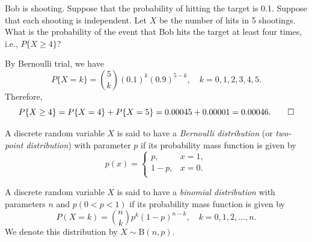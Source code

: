 \begin{example}
  Bob is shooting. Suppose that the probability of hitting the target is 0.1. Suppose that each shooting is independent. Let \(X\) be the number of hits in 5 shootings. What is the probability of the event that Bob hits the target at least four times, i.e., \(P\{X \geq 4\}\)?
\end{example}
\begin{solution}
  By Bernoulli trial, we have
  \[
    P\{X = k\} = \binom{5}{k} (0.1)^k (0.9)^{5-k}, \quad k = 0, 1, 2, 3, 4, 5.
  \]
  Therefore,
  \[
    P\{X \geq 4\} = P\{X = 4\} + P\{X = 5\} = 0.00045 + 0.00001 = 0.00046. \qedhere
  \]
\end{solution}

\begin{definition}
  A discrete random variable \(X\) is said to have a \emph{Bernoulli distribution} (or \emph{two-point distribution}) with parameter \(p\) if its probability mass function is given by
  \[
    p(x) = \begin{cases}
      p, & x = 1, \\
      1 - p, & x = 0. \\
    \end{cases}
  \]
\end{definition}

\begin{definition}
  A discrete random variable \(X\) is said to have a \emph{binomial distribution} with parameters \(n\) and \(p (0 < p < 1)\) if its probability mass function is given by
  \[
    P(X = k) = \binom{n}{k} p^k (1 - p)^{n - k}, \quad k = 0, 1, 2, \dots, n.
  \]
  We denote this distribution by \(X \sim \mathrm{B}(n, p)\).
\end{definition}

